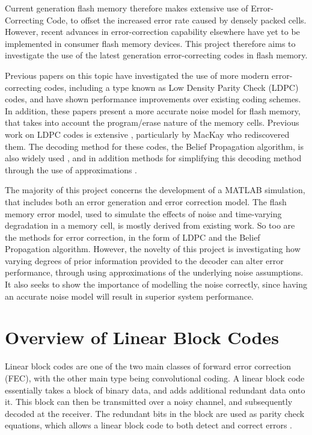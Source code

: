 \documentclass[11pt]{article}
\numberwithin{equation}{subsection}
\begin{document}
Current generation flash memory therefore makes extensive use of Error-Correcting Code, to offset the increased error rate caused by densely packed cells. However, recent advances in error-correction capability elsewhere have yet to be implemented in consumer flash memory devices. This project therefore aims to investigate the use of the latest generation error-correcting codes in flash memory. 

Previous papers \cite{dong2012estimating,DBLP:journals/corr/abs-1210-0149} on this topic have investigated the use of more modern error-correcting codes, including a type known as Low Density Parity Check (LDPC) codes, and have shown performance improvements over existing coding schemes. In addition, these papers present a more accurate noise model for flash memory, that takes into account the program/erase nature of the memory cells. Previous work on LDPC codes is extensive \cite{mncisit,gallager1962low}, particularly by MacKay who rediscovered them. The decoding method for these codes, the Belief Propagation algorithm, is also widely used \cite{davey1998low,chen2002near}, and in addition methods for simplifying this decoding method through the use of approximations \cite{zhao2005implementation,chen2005reduced,islam2011optimized}.

The majority of this project concerns the development of a MATLAB simulation, that includes both an error generation and error correction model. The flash memory error model, used to simulate the effects of noise and time-varying degradation in a memory cell, is mostly derived from existing work. So too are the methods for error correction, in the form of LDPC and the Belief Propagation algorithm. However, the novelty of this project is investigating how varying degrees of prior information provided to the decoder can alter error performance, through using approximations of the underlying noise assumptions. It also seeks to show the importance of modelling the noise correctly, since having an accurate noise model will result in superior system performance.

\section{Overview of Linear Block Codes}

Linear block codes are one of the two main classes of forward error correction (FEC), with the other main type being convolutional coding. A linear block code essentially takes a block of binary data, and adds additional redundant data onto it. This block can then be transmitted over a noisy channel, and subsequently decoded at the receiver. The redundant bits in the block are used as parity check equations, which allows a linear block code to both detect and correct errors \cite{tse2005fundamentals,proakis2001digital,haykin2008communication}.
\end{document}
